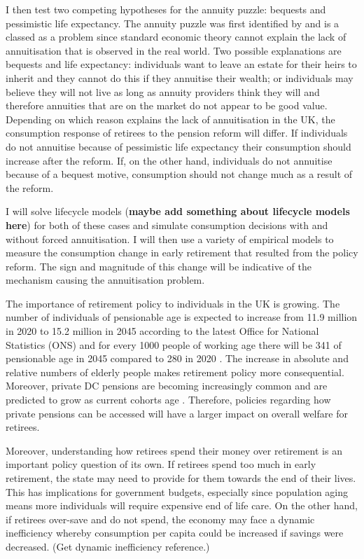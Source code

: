 \documentclass[12pt]{article}
\begin{document}
I then test two competing hypotheses for the annuity puzzle: bequests and
pessimistic life expectancy. The annuity puzzle was first identified by \cite{yaari_65} and is a classed as a problem
since standard economic theory cannot explain the lack of annuitisation that is observed in the real world.
Two possible explanations are bequests and life expectancy: individuals want to leave an estate for their heirs to
inherit and they cannot do this if they annuitise their wealth; or individuals may believe they will not live
as long as annuity providers think they will and therefore annuities that are on the market do not appear to be
good value. Depending on which reason explains the lack of annuitisation in the UK, the consumption response of
retirees to the pension
reform will differ. If individuals do not annuitise because of pessimistic life expectancy their
consumption should increase after the reform. If, on the other hand, individuals do not annuitise because of a bequest motive, consumption
should not change much as a result of the reform.

I will solve lifecycle models
(\textbf{maybe add something about lifecycle models here})
for both of these cases and simulate
consumption decisions with and without forced annuitisation. I will then use a variety of empirical models to measure
the consumption change in early retirement that resulted from the policy reform. The sign and magnitude of this change
will be indicative of the mechanism causing the annuitisation problem.


The importance of retirement policy to individuals in the UK is growing. The number of individuals of
pensionable age is expected to increase from 11.9 million in 2020 to 15.2 million in
2045 according to the latest Office for National Statistics (ONS) and for every 1000 people of working age there will be 341 of pensionable
age in 2045 compared to 280 in 2020 \cite{ons_population_predictions_2020}. The increase in absolute and relative
numbers of elderly people makes retirement policy more consequential. Moreover, private DC pensions are
becoming increasingly common and are predicted to grow as current cohorts age \cite{cribb_karjalainen_ifs_2023}.
Therefore, policies regarding how private pensions can be accessed will have a larger impact on overall welfare for
retirees.

Moreover, understanding how retirees spend their money over retirement is an important policy question of its own.
If retirees spend too much in early retirement, the state may need to provide for them towards the end of their
lives. This has implications for government budgets, especially since population aging means more individuals will
require expensive end of life care. On the other hand, if retirees over-save and do not spend, the economy may face
a dynamic inefficiency whereby consumption per capita could be increased if savings were decreased. (Get dynamic inefficiency
reference.)
\end{document}

